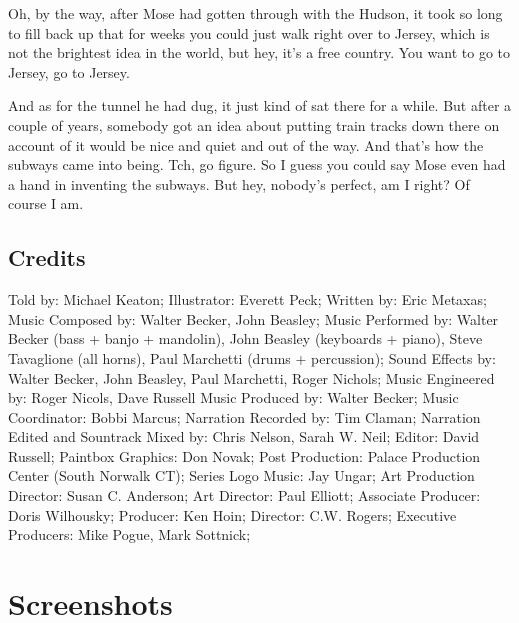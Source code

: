 Oh, by the way, after Mose had gotten through with the Hudson, it took so long to fill back up that for weeks you could just walk right over to Jersey, which is not the brightest idea in the world, but hey, it's a free country. You want to go to Jersey, go to Jersey.

And as for the tunnel he had dug, it just kind of sat there for a while. But after a couple of years, somebody got an idea about putting train tracks down there on account of it would be nice and quiet and out of the way. And that's how the subways came into being. Tch, go figure. So I guess you could say Mose even had a hand in inventing the subways. But hey, nobody's perfect, am I right? Of course I am.

\subsection{Credits}

Told by: Michael Keaton;
Illustrator: Everett Peck;
Written by: Eric Metaxas;
Music Composed by: Walter Becker, John Beasley;
Music Performed by: Walter Becker (bass + banjo + mandolin), John Beasley (keyboards + piano), Steve Tavaglione (all horns), Paul Marchetti (drums + percussion);
Sound Effects by: Walter Becker, John Beasley, Paul Marchetti, Roger Nichols;
Music Engineered by: Roger Nicols, Dave Russell
Music Produced by: Walter Becker;
Music Coordinator: Bobbi Marcus;
Narration Recorded by: Tim Claman;
Narration Edited and Sountrack Mixed by: Chris Nelson, Sarah W. Neil;
Editor: David Russell;
Paintbox Graphics: Don Novak;
Post Production: Palace Production Center (South Norwalk CT);
Series Logo Music: Jay Ungar;
Art Production Director: Susan C. Anderson;
Art Director: Paul Elliott;
Associate Producer: Doris Wilhousky;
Producer: Ken Hoin;
Director: C.W. Rogers;
Executive Producers: Mike Pogue, Mark Sottnick;

\clearpage
\newpage

\section{Screenshots}

